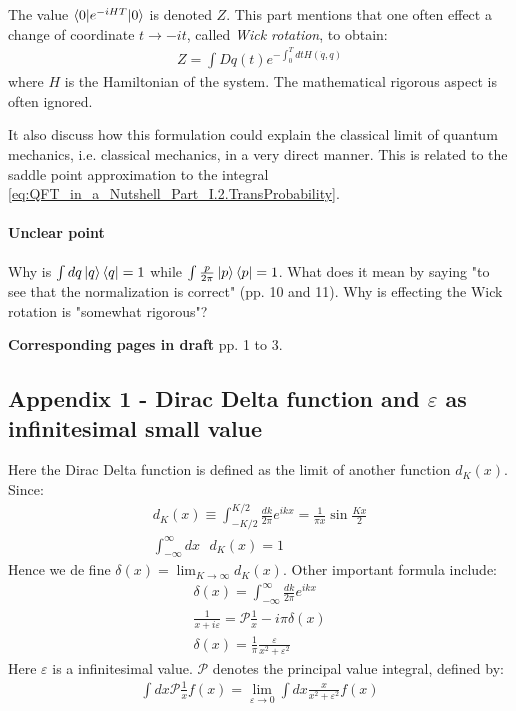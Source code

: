 \documentclass{book}
\numberwithin{equation}{subsection} %
\theoremstyle{definition}
\begin{document}
The value \(\braket{0|e^{-iHT}|0}\) is denoted $Z$. This part
mentions that one often effect a change of coordinate
$t \to -it$, called \textit{Wick rotation}, to obtain:
\begin{align}
    Z = \int Dq(t) e^{-\int_0^T dt H(\dot{q},q)}
\end{align}
where $H$ is the Hamiltonian of the system.
The mathematical rigorous aspect is often ignored.

It also discuss how this formulation could explain the classical
limit of quantum mechanics, i.e. classical mechanics, in a
very direct manner. This is related to the saddle point
approximation to the integral 
\ref{eq:QFT_in_a_Nutshell_Part_I.2.TransProbability}.

\paragraph{Unclear point}
Why is $\int dq \ket{q}\bra{q} = 1$ while $\int \frac{p}{2\pi}
\ket{p}\bra{p} = 1$. What does it mean by saying
"to see that the normalization is correct" (pp. 10 and 11).
Why is effecting the Wick rotation is "somewhat rigorous"?

\textbf{Corresponding pages in draft} pp. 1 to 3.

    \subsection{Appendix 1 - Dirac Delta function and
        \texorpdfstring{$\varepsilon$}{} as infinitesimal
        small value}

    Here the Dirac Delta function is defined as the limit of another
    function $d_K(x)$. Since:
    \begin{align}
        d_K(x) \equiv \int_{-K/2}^{K/2} \frac{dk}{2\pi} e^{ikx} = 
            \frac{1}{\pi x}\sin\frac{Kx}{2}\\
        \int_{-\infty}^{\infty} dx\text{ } d_K(x) = 1
    \end{align}
    Hence we de fine $\delta(x) = \lim_{K\to \infty}d_K(x)$.
    Other important formula include:
    \begin{align}
        \delta(x) = \int_{-\infty}^{\infty} \frac{dk}{2\pi}e^{ikx} \\
        \frac{1}{x+i\varepsilon} = \mathcal{P}\frac{1}{x}-i\pi \delta(x)\\
        \delta(x) = \frac{1}{\pi}\frac{\varepsilon}{x^2+\varepsilon^2}
    \end{align}
    Here $\varepsilon$ is a infinitesimal value. $\mathcal{P}$ denotes the
    principal value integral, defined by:
    \begin{align}
        \int dx \mathcal{P}\frac{1}{x}f(x) = \lim_{\varepsilon\to 0}
            \int dx \frac{x}{x^2+\varepsilon^2}f(x)
    \end{align}
\end{document}
